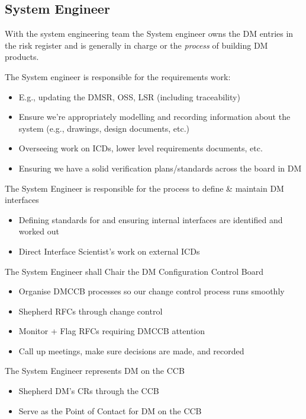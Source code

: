 \subsection{System Engineer \label{role:sysengineer}}
With the system engineering team  
 the System engineer 
 owns the DM entries in the risk register and is generally in charge or the {\em process} of building DM products. 

The System engineer  
is responsible for the requirements work:
\begin{itemize}
\item E.g., updating the DMSR, OSS, LSR (including traceability)
\item Ensure we’re appropriately modelling and recording information about the system (e.g.,
    drawings, design documents, etc.)
\item Overseeing work on ICDs, lower level requirements documents, etc.
\item Ensuring we have a solid verification plans/standards across the board in DM
\end{itemize}

The System Engineer is responsible for the process to define \& maintain DM interfaces
\begin{itemize}
\item Defining standards for and ensuring internal interfaces are identified and worked out
\item Direct Interface Scientist's work on external ICDs
\end{itemize}

The System Engineer shall Chair the DM Configuration Control Board 
\begin{itemize}
\item Organise DMCCB  processes so our change control process runs smoothly
\item Shepherd RFCs through change control
\item Monitor + Flag RFCs requiring DMCCB  attention
\item Call up meetings, make sure decisions are made, and recorded
\end{itemize}

The System Engineer represents DM on the CCB
\begin{itemize}
\item Shepherd DM’s CRs through the CCB
\item Serve as the Point of Contact for DM on the CCB
\end{itemize}

